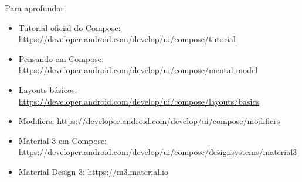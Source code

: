 \documentclass[aspectratio=169,10pt]{beamer}
\begin{document}
\begin{frame}{Para aprofundar}
  \small
  \begin{itemize}
    \item Tutorial oficial do Compose: \url{https://developer.android.com/develop/ui/compose/tutorial}
    \item Pensando em Compose: \url{https://developer.android.com/develop/ui/compose/mental-model}
    \item Layouts básicos: \url{https://developer.android.com/develop/ui/compose/layouts/basics}
    \item Modifiers: \url{https://developer.android.com/develop/ui/compose/modifiers}
    \item Material 3 em Compose: \url{https://developer.android.com/develop/ui/compose/designsystems/material3}
    \item Material Design 3: \url{https://m3.material.io}
  \end{itemize}
\end{frame}

\end{document}
